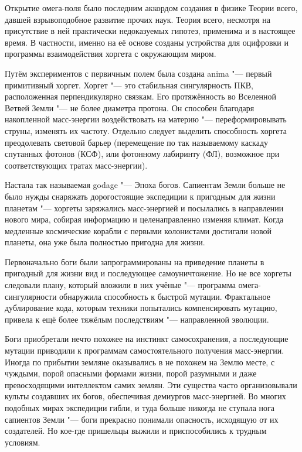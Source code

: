 \documentclass[a4paper,10pt,fleqn]{book}
\begin{document}
Открытие омега-поля было последним аккордом создания в физике Теории всего, давшей взрывоподобное развитие прочих наук.
Теория всего, несмотря на присутствие в ней практически недоказуемых гипотез, применима и в настоящее время.
В частности, именно на её основе созданы устройства для оцифровки и программы взаимодействия хоргета с окружающим миром.

Путём экспериментов с первичным полем была создана anima "--- первый примитивный хоргет.
Хоргет "--- это стабильная сингулярность ПКВ, расположенная перпендикулярно связкам.
Его протяжённость во Вселенной Ветвей Земли "--- не более диаметра протона.
Он способен благодаря накопленной масс-энергии воздействовать на материю "--- переформировывать струны, изменять их частоту.
Отдельно следует выделить способность хоргета преодолевать световой барьер (перемещение по так называемому каскаду спутанных фотонов (КСФ), или фотонному лабиринту (ФЛ), возможное при соответствующих тратах масс-энергии).

Настала так называемая godage "--- Эпоха богов.
Сапиентам Земли больше не было нужды снаряжать дорогостоящие экспедиции к пригодным для жизни планетам "--- хоргеты заряжались масс-энергией и посылались в направлении нового мира, собирая информацию и целенаправленно изменяя климат.
Когда медленные космические корабли с первыми колонистами достигали новой планеты, она уже была полностью пригодна для жизни.

Первоначально боги были запрограммированы на приведение планеты в пригодный для жизни вид и последующее самоуничтожение.
Но не все хоргеты следовали плану, который вложили в них учёные "--- программа омега-сингулярности обнаружила способность к быстрой мутации.
Фрактальное дублирование кода, которым техники попытались компенсировать мутацию, привела к ещё более тяжёлым последствиям "--- направленной эволюции.

Боги приобретали нечто похожее на инстинкт самосохранения, а последующие мутации приводили к программам самостоятельного получения масс-энергии.
Иногда по прибытии земляне оказывались в не похожем на Землю месте, с чуждыми, порой опасными формами жизни, порой разумными и даже превосходящими интеллектом самих землян.
Эти существа часто организовывали культы создавших их богов, обеспечивая демиургов масс-энергией.
Во многих подобных мирах экспедиции гибли, и туда больше никогда не ступала нога сапиентов Земли "--- боги прекрасно понимали опасность, исходящую от их создателей.
Но кое-где пришельцы выжили и приспособились к трудным условиям.
\end{document}
